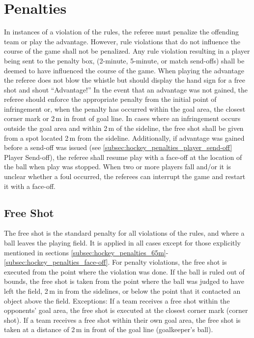 \section{Penalties}
In instances of a violation of the rules, the referee must penalize the oﬀending team or play the advantage.
However, rule violations that do not influence the course of the game shall not be penalized.
Any rule violation resulting in a player being sent to the penalty box, (2-minute, 5-minute, or match send-offs) shall be deemed to have influenced the course of the game.
When playing the advantage the referee does not blow the whistle but should display the hand sign for a free shot and shout ``Advantage!''
In the event that an advantage was not gained, the referee should enforce the appropriate penalty from the initial point of infringement or, when the penalty has occurred within the goal area, the closest corner mark or 2\,m in front of goal line.
In cases where an infringement occurs outside the goal area and within 2\,m of the sideline, the free shot shall be given from a spot located 2\,m from the sideline.
Additionally, if advantage was gained before a send-off was issued (see \ref{subsec:hockey_penalties_player_send-off} Player Send-off), the referee shall resume play with a face-off at the location of the ball when play was stopped.
When two or more players fall and/or it is unclear whether a foul occurred, the referees can interrupt the game and restart it with a face-off.

\subsection{Free Shot}\label{subsec:hockey_free_shot}
The free shot is the standard penalty for all violations of the rules, and where a ball leaves the playing field.
It is applied in all cases except for those explicitly mentioned in sections \ref{subsec:hockey_penalties_65m}-\ref{subsec:hockey_penalties_face-off}.
For penalty violations, the free shot is executed from the point where the violation was done.
If the ball is ruled out of bounds, the free shot is taken from the point where the ball was judged to have left the field, 2\,m in from the sidelines, or below the point that it contacted an object above the field.
Exceptions: If a team receives a free shot within the opponents' goal area, the free shot is executed at the closest corner mark (corner shot).
If a team receives a free shot within their own goal area, the free shot is taken at a distance of 2\,m in front of the goal line (goalkeeper's ball).

